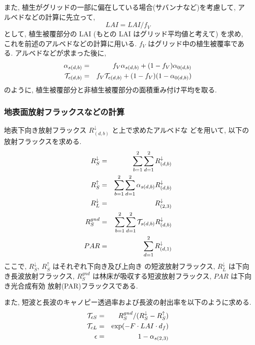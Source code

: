 また, 植生がグリッドの一部に偏在している場合(サバンナなど)を考慮して, ア
ルベドなどの計算に先立って, 
\begin{equation}
  LAI = LAI / f_V 
\end{equation}
として, 植生被覆部分の LAI (もとの LAI はグリッド平均値と考えて) を求め,
これを前述のアルベドなどの計算に用いる. 
$f_V$ はグリッド中の植生被覆率である. 
アルベドなどが求まった後に, 
\begin{eqnarray}
  \alpha_{s(d,b)} &=& f_V \alpha_{s(d,b)} 
                       + ( 1 - f_V ) \alpha_{0(d,b)} \\
  {\cal{T}}_{c(d,b)} &=& f_V {\cal{T}}_{c(d,b)} 
                       + ( 1 - f_V ) ( 1 - \alpha_{0(d,b)} )
\end{eqnarray}
のように, 植生被覆部分と非植生被覆部分の面積重み付け平均を取る. 

\subsubsection{地表面放射フラックスなどの計算}

地表下向き放射フラックス $R^{\downarrow}_{(d,b)}$ と上で求めたアルベドな
どを用いて, 以下の放射フラックスを求める. 
\begin{eqnarray}
 R^{\downarrow}_S &=& \sum_{b=1}^2\sum_{d=1}^2 R^{\downarrow}_{(d,b)} \\
 R^{\uparrow}_S &=& \sum_{b=1}^2\sum_{d=1}^2 \alpha_{s(d,b)} R^{\downarrow}_{(d,b)} \\
 R^{\downarrow}_L &=& R^{\downarrow}_{(2,3)} \\
 R^{gnd}_S &=& \sum_{b=1}^2\sum_{d=1}^2 {\cal{T}}_{s(d,b)} R^{\downarrow}_{(d,b)} \\
 PAR &=& \sum_{d=1}^2 R^{\downarrow}_{(d,1)}
\end{eqnarray}
ここで, $R^{\downarrow}_S$, $R^{\uparrow}_S$ はそれぞれ下向き及び上向き
の短波放射フラックス, $R^{\downarrow}_L$ は下向き長波放射フラックス, 
$R^{gnd}_S$ は林床が吸収する短波放射フラックス, $PAR$ は下向き光合成有効
放射(PAR)フラックスである. 

また, 短波と長波のキャノピー透過率および長波の射出率を以下のように求める. 
\begin{eqnarray}
 {\cal{T}}_{cS} &=& R^{gnd}_S / ( R^{\downarrow}_S - R^{\uparrow}_S ) \\
 {\cal{T}}_{cL} &=& \exp( - F \cdot LAI \cdot d_f ) \\
 \epsilon &=& 1 - \alpha_{s(2,3)}
\end{eqnarray}

